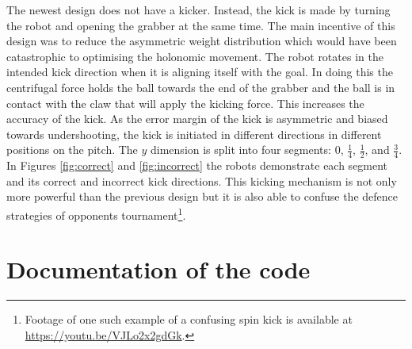 \documentclass[a4paper,12pt]{article}
\begin{document}
The newest design does not have a kicker. Instead, the kick is made by turning the robot and opening the grabber at the same time. The main incentive of this design was to reduce the asymmetric weight distribution which would have been catastrophic to optimising the holonomic movement. The robot rotates in the intended kick direction when it is aligning itself with the goal. In doing this the centrifugal force holds the ball towards the end of the grabber and the ball is in contact with the claw that will apply the kicking force. This increases the accuracy of the kick. As the error margin of the kick is asymmetric and biased towards undershooting, the kick is initiated in different directions in different positions on the pitch. The $y$ dimension is split into four segments: $0$, $\frac{1}{4}$, $\frac{1}{2}$, and $\frac{3}{4}$. In Figures \ref{fig:correct} and \ref{fig:incorrect} the robots demonstrate each segment and its correct and incorrect kick directions. This kicking mechanism is not only more powerful than the previous design but it is also able to confuse the defence strategies of opponents tournament\footnote{Footage of one such example of a confusing spin kick is available at \url{https://youtu.be/VJLo2x2gdGk}.}.

\section{Documentation of the code}
\end{document}

